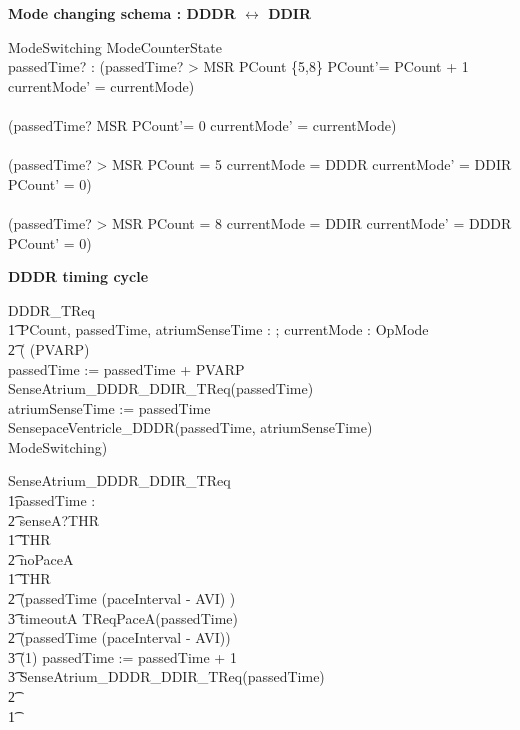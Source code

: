 \textbf{Mode changing schema : DDDR $\leftrightarrow$ DDIR}

\begin{schema}{ModeSwitching}
 \Delta ModeCounterState\\
  passedTime? : \nat 
\where
(passedTime? > MSR \land PCount \notin \{5,8\} \land PCount'= PCount + 1 \land currentMode' = currentMode)\\
\lor \\
(passedTime? \leq MSR \land PCount'= 0 \land currentMode' = currentMode)\\
\lor \\
(passedTime? > MSR \land PCount = 5 \land currentMode = DDDR \land currentMode' = DDIR \land PCount' = 0) \\
\lor \\
(passedTime? > MSR \land PCount = 8 \land currentMode = DDIR \land currentMode' = DDDR \land PCount' = 0) \\
\end{schema}


\textbf{DDDR timing cycle}

\begin{circusaction}
DDDR\_TReq \circdef \\
\t1 \circvres PCount, passedTime, atriumSenseTime : \nat; \circvres currentMode : OpMode \\
  \t2 \circspot (
  \circwait(PVARP) \circseq \\
   passedTime := passedTime + PVARP \circseq \\
   SenseAtrium\_DDDR\_DDIR\_TReq(passedTime) \circseq \\
   atriumSenseTime := passedTime \circseq \\
   SensepaceVentricle\_DDDR(passedTime, atriumSenseTime) \circseq \\  
   ModeSwitching) \\ 
\end{circusaction}


\begin{circusaction}
SenseAtrium\_DDDR\_DDIR\_TReq \circdef \\
\t1\circvres passedTime : \nat \\
\t2 \circspot senseA?THR \then \\
\t1 \circif  THR  \circthen\\
\t2 noPaceA \then \Skip \\
\t1 \circelse \lnot  THR  \circthen\\
\t2 \circif  (passedTime \geq (paceInterval - AVI) ) \circthen \\
\t3 timeoutA \then TReqPaceA(passedTime) \\
\t2 \circelse \lnot (passedTime \geq (paceInterval - AVI)) \circthen \\
\t3 \circwait(1) \circseq passedTime := passedTime + 1 \circseq\\
\t3 SenseAtrium\_DDDR\_DDIR\_TReq(passedTime) \\
\t2 \circfi\\ 
\t1 \circfi \\ 
\end{circusaction}

